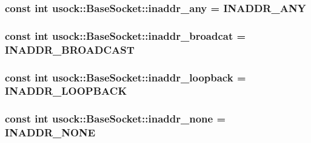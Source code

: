 \hypertarget{classusock_1_1BaseSocket_7b468e99479cf6c1e78e7c11ffe3b7c4}{
\subsubsection[{inaddr\_\-any}]{\setlength{\rightskip}{0pt plus 5cm}const int {\bf usock::BaseSocket::inaddr\_\-any} = INADDR\_\-ANY}}
\label{classusock_1_1BaseSocket_7b468e99479cf6c1e78e7c11ffe3b7c4}


\hypertarget{classusock_1_1BaseSocket_0ecd3c3f3d1c7d39e5d208ff9ae05578}{
\subsubsection[{inaddr\_\-broadcat}]{\setlength{\rightskip}{0pt plus 5cm}const int {\bf usock::BaseSocket::inaddr\_\-broadcat} = INADDR\_\-BROADCAST}}
\label{classusock_1_1BaseSocket_0ecd3c3f3d1c7d39e5d208ff9ae05578}


\hypertarget{classusock_1_1BaseSocket_bb1df5061201886e6190acdbf0f197e4}{
\subsubsection[{inaddr\_\-loopback}]{\setlength{\rightskip}{0pt plus 5cm}const int {\bf usock::BaseSocket::inaddr\_\-loopback} = INADDR\_\-LOOPBACK}}
\label{classusock_1_1BaseSocket_bb1df5061201886e6190acdbf0f197e4}


\hypertarget{classusock_1_1BaseSocket_47df56bb0f6fadf6d309517526704efd}{
\subsubsection[{inaddr\_\-none}]{\setlength{\rightskip}{0pt plus 5cm}const int {\bf usock::BaseSocket::inaddr\_\-none} = INADDR\_\-NONE}}
\label{classusock_1_1BaseSocket_47df56bb0f6fadf6d309517526704efd}


